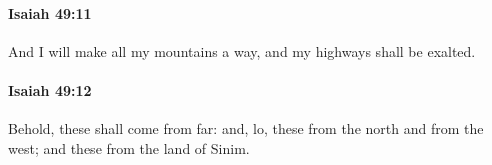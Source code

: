 		\paragraph{Isaiah 49:11} %
			\label{ISAIAH-49-11}

			And I will make all my mountains a way, and my highways shall be exalted.


		\paragraph{Isaiah 49:12} %
			\label{ISAIAH-49-12}

			Behold, these shall come from far: and, lo, these from the north and from the west; and these from the land of Sinim.


